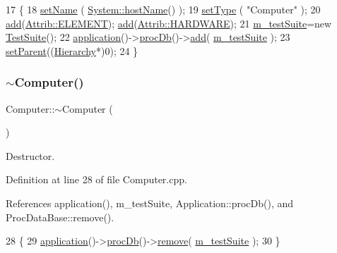 \begin{DoxyCode}
17                      \{
18   \hyperlink{classObject_ae30fea75683c2d149b6b6d17c09ecd0c}{setName} ( \hyperlink{namespaceSystem_a89320a729880098922e8b505db1137ec}{System::hostName}() );
19   \hyperlink{classObject_aae534cc9d982bcb9b99fd505f2e103a5}{setType} ( \textcolor{stringliteral}{"Computer"} );
20   \hyperlink{classAttrib_a235f773af19c900264a190b00a3b4ad7}{add}(\hyperlink{classAttrib_a69e171d7cc6417835a5a306d3c764235a7788bc5dd333fd8ce18562b269c9dab1}{Attrib::ELEMENT});  \hyperlink{classAttrib_a235f773af19c900264a190b00a3b4ad7}{add}(\hyperlink{classAttrib_a69e171d7cc6417835a5a306d3c764235a61ceb22149f365f1780d18f9d1459423}{Attrib::HARDWARE});
21   \hyperlink{classComputer_a5418f176fa9fbd08356ad251f047adcd}{m\_testSuite}=\textcolor{keyword}{new} \hyperlink{namespaceTestSuite}{TestSuite}();
22   \hyperlink{Tools_8h_a27885a3c35afe79029fb830f32f66458}{application}()->\hyperlink{classApplication_aa5c28af1a7e1c41dada2db2a4d03c57d}{procDb}()->\hyperlink{classProcDataBase_a0aafeb65a41b92a6d1fdd67f363ef826}{add}( \hyperlink{classComputer_a5418f176fa9fbd08356ad251f047adcd}{m\_testSuite} );
23   \hyperlink{classHierarchy_a585ad1aeec16077a0e532ab8b4fc557b}{setParent}((\hyperlink{classHierarchy}{Hierarchy}*)0);  
24 \}
\end{DoxyCode}
\mbox{\label{classComputer_a633f86288c20c5aa1eed7f14fb069272}} 
\subsubsection{\texorpdfstring{$\sim$\+Computer()}{~Computer()}}
{\footnotesize\ttfamily Computer\+::$\sim$\+Computer (\begin{DoxyParamCaption}{ }\end{DoxyParamCaption})\hspace{0.3cm}{\ttfamily [virtual]}}



Destructor. 



Definition at line 28 of file Computer.\+cpp.



References application(), m\+\_\+test\+Suite, Application\+::proc\+Db(), and Proc\+Data\+Base\+::remove().


\begin{DoxyCode}
28                     \{
29   \hyperlink{Tools_8h_a27885a3c35afe79029fb830f32f66458}{application}()->\hyperlink{classApplication_aa5c28af1a7e1c41dada2db2a4d03c57d}{procDb}()->\hyperlink{classProcDataBase_a0413976bac8f233b31eab6d7a83866b9}{remove}( \hyperlink{classComputer_a5418f176fa9fbd08356ad251f047adcd}{m\_testSuite} );
30 \} 
\end{DoxyCode}


